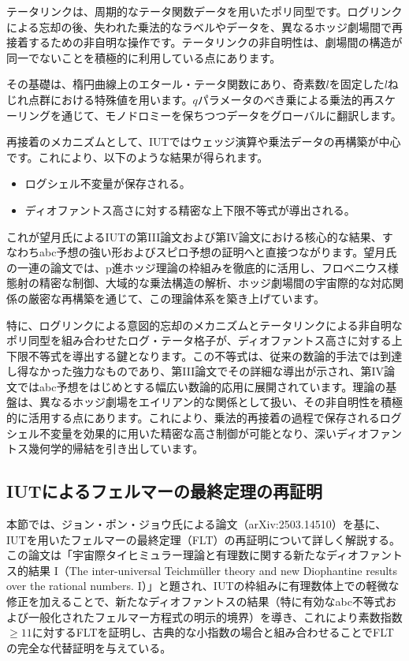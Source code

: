 \documentclass[a4paper,12pt,notitlepage]{jsreport}
\begin{document}
テータリンクは、周期的なテータ関数データを用いたポリ同型です。ログリンクによる忘却の後、失われた乗法的なラベルやデータを、異なるホッジ劇場間で再接着するための非自明な操作です。テータリンクの非自明性は、劇場間の構造が同一でないことを積極的に利用している点にあります。

その基礎は、楕円曲線上のエタール・テータ関数にあり、奇素数$l$を固定した$l$ねじれ点群における特殊値を用います。$q$パラメータのべき乗による乗法的再スケーリングを通じて、モノドロミーを保ちつつデータをグローバルに翻訳します。

再接着のメカニズムとして、IUTではウェッジ演算や乗法データの再構築が中心です。これにより、以下のような結果が得られます。
\begin{itemize}
  \item ログシェル不変量が保存される。
  \item ディオファントス高さに対する精密な上下限不等式が導出される。
\end{itemize}

これが望月氏によるIUTの第III論文および第IV論文における核心的な結果、すなわちabc予想の強い形およびスピロ予想の証明へと直接つながります。望月氏の一連の論文では、p進ホッジ理論の枠組みを徹底的に活用し、フロベニウス様態射の精密な制御、大域的な乗法構造の解析、ホッジ劇場間の宇宙際的な対応関係の厳密な再構築を通じて、この理論体系を築き上げています。

特に、ログリンクによる意図的忘却のメカニズムとテータリンクによる非自明なポリ同型を組み合わせたログ・テータ格子が、ディオファントス高さに対する上下限不等式を導出する鍵となります。この不等式は、従来の数論的手法では到達し得なかった強力なものであり、第III論文でその詳細な導出が示され、第IV論文ではabc予想をはじめとする幅広い数論的応用に展開されています。理論の基盤は、異なるホッジ劇場をエイリアン的な関係として扱い、その非自明性を積極的に活用する点にあります。これにより、乗法的再接着の過程で保存されるログシェル不変量を効果的に用いた精密な高さ制御が可能となり、深いディオファントス幾何学的帰結を引き出しています。

\subsection{IUTによるフェルマーの最終定理の再証明}

本節では、ジョン・ポン・ジョウ氏による論文（arXiv:2503.14510）を基に、IUTを用いたフェルマーの最終定理（FLT）の再証明について詳しく解説する。この論文は「宇宙際タイヒミュラー理論と有理数に関する新たなディオファントス的結果 I（The inter-universal Teichmüller theory and new Diophantine results over the rational numbers. I）」と題され、IUTの枠組みに有理数体上での軽微な修正を加えることで、新たなディオファントスの結果（特に有効なabc不等式および一般化されたフェルマー方程式の明示的境界）を導き、これにより素数指数\(\geq 11\)に対するFLTを証明し、古典的な小指数の場合と組み合わせることでFLTの完全な代替証明を与えている。
\end{document}
